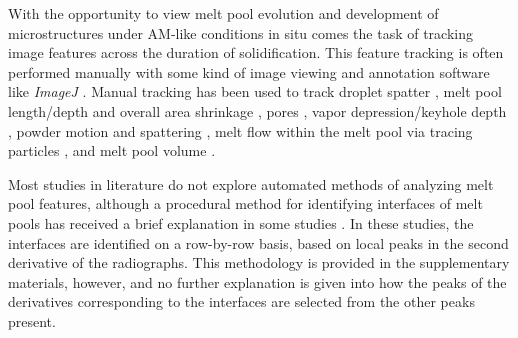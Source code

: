 With the opportunity to view melt pool evolution and development of
microstructures under AM-like conditions in situ comes the task of
tracking image features across the duration of solidification.
This feature tracking is often performed manually with some kind of
image viewing and annotation software like \textit{ImageJ} \cite{imagej}.
Manual tracking has been used to track droplet spatter
\cite{Leung2018nat,Leung2018am}, melt pool length/depth and overall area
shrinkage \cite{Leung2018am}, pores \cite{Leung2018nat,Martin2019}, vapor
depression/keyhole depth \cite{Martin2019,Cunningham2019}, powder motion
and spattering \cite{Guo2018}, melt flow within the melt pool via tracing
particles \cite{Hojjatzadeh2019}, and melt pool volume \cite{Guo2019}.

Most studies in literature do not explore automated methods of analyzing
melt pool features, although a procedural method for identifying interfaces
of melt pools has received a brief explanation in some studies
\cite{Zhao2017,Wolff2019}. In these studies, the interfaces
are identified on a row-by-row basis, based on local peaks in the second
derivative of the radiographs. This methodology is provided in the
supplementary materials, however, and no further explanation is given into
how the peaks of the derivatives corresponding to the interfaces are
selected from the other peaks present.

